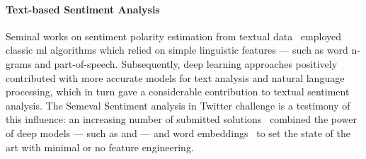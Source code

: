 \paragraph{Text-based Sentiment Analysis}
Seminal works on sentiment polarity estimation from textual data~\cite{go2009twitter,bermingham2010classifying} employed classic \gls{ml} algorithms which relied on simple linguistic features --- such as word n-grams and part-of-speech.
Subsequently, deep learning approaches positively contributed with more accurate models for text analysis and natural language processing, which in turn gave a considerable contribution to textual sentiment analysis.
The Semeval Sentiment analysis in Twitter \cite{nakov2016semeval} challenge is a testimony of this influence: an increasing number of submitted solutions~\cite{deriu2016swisscheese,rouvier2016sensei} combined the power of deep models --- such as  and  --- and word embeddings~\cite{mikolov2013distributed,pennington2014glove} to set the state of the art with minimal or no feature engineering.


